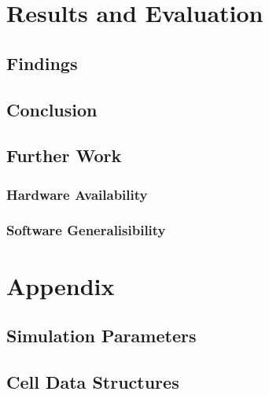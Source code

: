 \documentclass{UoYCSproject}
\begin{document}
\chapter{Results and Evaluation}
\section{Findings}
\section{Conclusion}

\section{Further Work}
\subsection{Hardware Availability}

\subsection{Software Generalisibility}%



\printbibliography

\chapter{Appendix}
\section{Simulation Parameters}
\section{Cell Data Structures}
 
\end{document}
